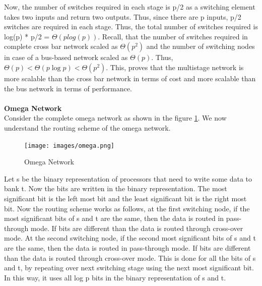 \documentclass[12pt]{article}
\begin{document}
Now, the number of switches required in each stage is p/2 as a switching element takes two inputs and return two outputs. Thus, 
since there are p inputs, p/2 switches are required in each stage. Thus, the total number of switches required is log(p) * p/2 = $\Theta(plog(p))$.
Recall, that the number of switches required in complete cross bar network scaled as $\Theta(p^2)$ and the number of switching nodes in case of a bus-based network
scaled as $\Theta(p)$. Thus, $\Theta(p)<\Theta(p \log p)<\Theta(p^2)$. This, proves that the 
multistage network is more scalable than the cross bar network in terms of cost and more scalable than the bus network in terms of performance. \\
\\
\textbf{Omega Network}\\
Consider the complete omega network as shown in the figure \ref{fig:omega}.
We now understand the routing scheme of the omega network.
\begin{figure}[H]
    \centering
    \texttt{[image: images/omega.png]}
    \caption{Omega Network}
    \label{fig:omega}
\end{figure}
Let s be the binary representation of processors that need to write some data to bank t.
Now the bits are written in the binary representation. The most significant bit is the left most bit and the least 
significant bit is the right most bit. Now the routing scheme works as follows, at the first switching node, if the most
significant bits of s and t are the same, then the data is routed in pass-through mode. If bits are different than the data is routed through
cross-over mode. At the second switching node, if the second most significant bits of s and t are the same, then the data is routed in pass-through mode.
If bits are different than the data is routed through cross-over mode. This is done for all the bits of s and t, by repeating over 
next switching stage using the next most significant bit. In this way, it uses all log p bits in the binary representation of s and t.
\end{document}

